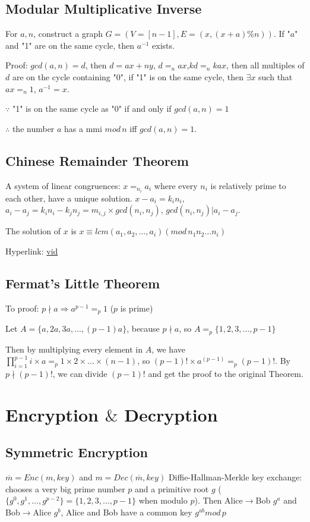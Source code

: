 \documentclass[12pt,a4paper]{ctexrep}
\begin{document}
\subsection{Modular Multiplicative Inverse} 
For $a,n$, construct a graph $G=(V=[n-1],E=(x,(x+a)\%n))$. If "$a$" and "1" are on the same cycle, then $a^{-1}$ exists.

Proof: $gcd(a,n) = d$, then $d = ax+ny$, $d =_n ax$,$kd =_n kax$, then all multiples of $d$ are on the cycle containing "0", if "1" is on the same cycle, then $\exists x$ such that $ax =_n 1$, $a^{-1} = x$.

$\because$ "1" is on the same cycle as "0" if and only if $gcd(a,n)=1$

$\therefore$ the number $a$ has a mmi $mod\, n$ iff $gcd(a,n)=1$.

\subsection{Chinese Remainder Theorem}
A system of linear congruences: $x =_{n_i} a_i$ where every $n_i$ is relatively prime to each other, have a unique solution. $x-a_i = k_i n_i$, $a_i-a_j = k_in_i-k_jn_j = m_{i,j} \times gcd(n_i,n_j)$, $gcd(n_i,n_j)|a_i-a_j$. 

The solution of $x$ is $x\equiv lcm(a_1,a_2,\dots,a_i) (mod\, n_1n_2\dots n_i)$

Hyperlink: \href{https://youtu.be/EolotL9HN8k?list=PL22w63XsKjqyg3TEfDGsWoMQgWMUMjYhl}{vid}
\subsection{Fermat's Little Theorem}
To proof: $p \nmid a \Rightarrow a^{p-1}=_p 1$ ($p$ is prime)

Let $A=\{a,2a,3a,\dots,(p-1)a\}$, because $p \nmid a$, so $A =_p \{1,2,3,\dots,p-1\}$

Then by multiplying every element in $A$, we have $\prod_{i=1}^{p-1} i\times a =_p 1\times 2\times \dots \times (n-1)$, so $(p-1)!\times a^(p-1) =_p (p-1)!$. By $p\nmid (p-1)!$, we can divide $(p-1)!$ and get the proof to the original Theorem.


\section{Encryption $\&$ Decryption}
\subsection{Symmetric Encryption}
$\overline{m} = Enc(m,key)$ and $m = Dec(\overline{m},key)$
Diffie-Hallman-Merkle key exchange: chooses a very big prime number $p$ and a primitive root $g$ ($\{g^0,g^1,\dots, g^{p-2}\} = \{1,2,3,\dots, p-1\}$ when modulo $p$). Then Alice$\rightarrow$Bob $g^a$ and Bob$\rightarrow$Alice $g^b$, Alice and Bob have a common key $g^{ab} mod\, p$
\end{document}

